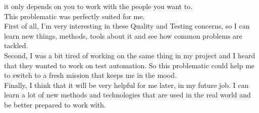 it only depends on you to work with the people you want to. \\
\newline
This problematic was perfectly suited for me. \\
First of all, I'm very interesting in these Quality and Testing concerns,
so I can learn new things, methods, tools about it and see how common
problems are tackled. \\
Second, I was a bit tired of working on the same thing in my project and
I heard that they wanted to work on test automation.
So this problematic could help me to switch to a fresh mission that keeps
me in the mood. \\
Finally, I think that it will be very helpful for me later, in my future
job.
I can learn a lot of new methods and technologies that are used in the
real world and be better prepared to work with.